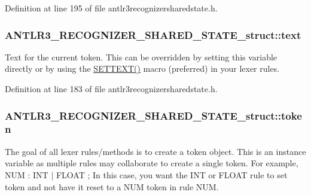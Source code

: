 Definition at line 195 of file antlr3recognizersharedstate.\-h.

\hypertarget{struct_a_n_t_l_r3___r_e_c_o_g_n_i_z_e_r___s_h_a_r_e_d___s_t_a_t_e__struct_a2a40580da035969808c85674b821fa46}{
\subsubsection[{text}]{ A\-N\-T\-L\-R3\-\_\-\-R\-E\-C\-O\-G\-N\-I\-Z\-E\-R\-\_\-\-S\-H\-A\-R\-E\-D\-\_\-\-S\-T\-A\-T\-E\-\_\-struct\-::text}}\label{struct_a_n_t_l_r3___r_e_c_o_g_n_i_z_e_r___s_h_a_r_e_d___s_t_a_t_e__struct_a2a40580da035969808c85674b821fa46}
Text for the current token. This can be overridden by setting this variable directly or by using the \hyperlink{cif_lexer_8cpp_a481c85399e38469a2114e6fa3d7ebcb0}{S\-E\-T\-T\-E\-X\-T()} macro (preferred) in your lexer rules. 

Definition at line 183 of file antlr3recognizersharedstate.\-h.

\hypertarget{struct_a_n_t_l_r3___r_e_c_o_g_n_i_z_e_r___s_h_a_r_e_d___s_t_a_t_e__struct_ad1a8beb13e3a3da89d3ed9e51f41ea0b}{
\subsubsection[{token}]{ A\-N\-T\-L\-R3\-\_\-\-R\-E\-C\-O\-G\-N\-I\-Z\-E\-R\-\_\-\-S\-H\-A\-R\-E\-D\-\_\-\-S\-T\-A\-T\-E\-\_\-struct\-::token}}\label{struct_a_n_t_l_r3___r_e_c_o_g_n_i_z_e_r___s_h_a_r_e_d___s_t_a_t_e__struct_ad1a8beb13e3a3da89d3ed9e51f41ea0b}
The goal of all lexer rules/methods is to create a token object. This is an instance variable as multiple rules may collaborate to create a single token. For example, N\-U\-M \-: I\-N\-T $\vert$ F\-L\-O\-A\-T ; In this case, you want the I\-N\-T or F\-L\-O\-A\-T rule to set token and not have it reset to a N\-U\-M token in rule N\-U\-M. 

